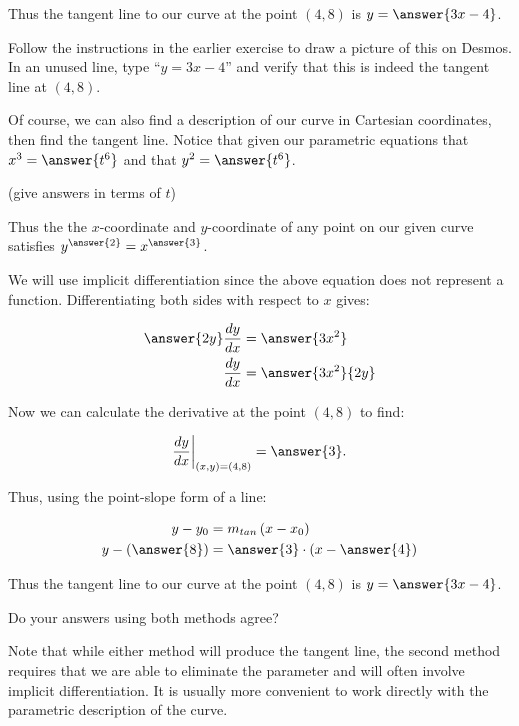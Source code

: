 \documentclass{ximera}
\begin{document}
\begin{exercise}
\begin{exercise}
Thus the tangent line to our curve at the point $(4, 8)$ is $y=\answer{3x-4}$. 

\begin{exercise}
Follow the instructions in the earlier exercise to draw a picture of this on Desmos. In an unused line, type ``$y=3x-4$'' and verify that this is indeed the tangent line at $(4,8)$.
\end{exercise}
\end{exercise}
\begin{exercise}
Of course, we can also find a description of our curve in Cartesian coordinates, then find the tangent line.  Notice that given our parametric equations that $x^3=\answer{t^6}$ and that $y^2=\answer{t^6}$.

(give answers in terms of $t$)

Thus the the $x$-coordinate and $y$-coordinate of any point on our given curve satisfies $y^{\answer{2}}=x^{\answer{3}}$. 

We will use implicit differentiation since the above equation does not represent a function.  Differentiating both sides with respect to $x$ gives:

\begin{align*}
\answer{2y}\dd[y]{x} &= \answer{3x^2} \\
\dd[y]{x} &= \answer{3x^2}{2y}
\end{align*}

\begin{exercise}
Now we can calculate the derivative at the point $(4,8)$ to find:

\[
\dd[y]{x}\bigg|_{(x,y)=(4,8)} = \answer{3}.
\]

Thus, using the point-slope form of a line:

\begin{align*}
y-y_0& = m_{tan}\left(x-x_0\right) \\
y-\left(\answer{8}\right)& =\answer{3} \cdot \left(x-\answer{4}\right) \\
\end{align*}

Thus the tangent line to our curve at the point $(4, 8)$ is $y=\answer{3x-4}$. 
\end{exercise}
\end{exercise}

Do your answers using both methods agree?

\begin{multipleChoice}
\end{multipleChoice}

\begin{remark}
Note that while either method will produce the tangent line, the second method requires that we are able to eliminate the parameter and will often involve implicit differentiation.  It is usually more convenient to work directly with the parametric description of the curve.
\end{remark}
\end{exercise}
\end{document}
